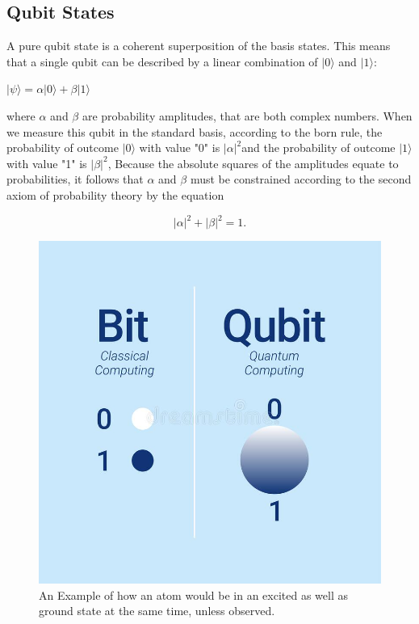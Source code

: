 \documentclass[11pt]{article}
\begin{document}
\subsection{Qubit States}

A pure qubit state is a coherent superposition of the basis states. This means that a single qubit can be described by a linear combination of ${\displaystyle |0\rangle } $ and ${\displaystyle |1\rangle }$:

$ {\displaystyle |\psi \rangle =\alpha |0\rangle +\beta |1\rangle }$

where $\alpha$ and \(\beta\) are probability amplitudes, that are both complex numbers. When we measure this qubit in the standard basis, according to the born rule, the probability of outcome $ |0\rangle $ with value "0" is ${\displaystyle |\alpha |^{2}} $and the probability of outcome ${\displaystyle |1\rangle }$ with value "1" is ${\displaystyle |\beta |^{2}}$, Because the absolute squares of the amplitudes equate to probabilities, it follows that ${\displaystyle \alpha }$  and ${\displaystyle \beta }$ must be constrained according to the second axiom of probability theory by the equation

$${\displaystyle |\alpha |^{2}+|\beta |^{2}=1.}$$

\begin{figure}
	\centering
	\includegraphics[scale = 0.3]{qbits.jpg}
	\caption{An Example of how an atom would be in an excited as well as ground state at the same time, unless observed. }
\end{figure}
\end{document}
